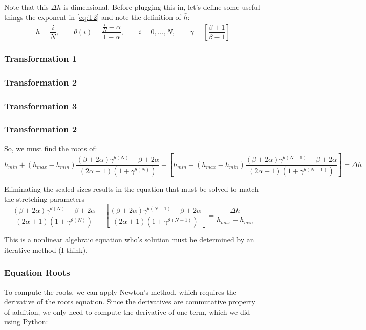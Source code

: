 \documentclass[11pt]{article}
\newcommand{\gammadef}{\left[\frac{\beta+1}{\beta-1}\right]}
\newcommand{\g}{\gamma}
\begin{document}
Note that this $\Delta h$ is dimensional. Before plugging this in, let's define some useful things the exponent in \ref{eq:T2} and note the definition of $\bar{h}$:
\begin{equation}
	\bar{h} = \frac{i}{N}, \qquad
	\theta(i) = \frac{\frac{i}{N} - \alpha}{1 - \alpha},
	\qquad i=0,...,N,
	\qquad \g = \gammadef
\end{equation}

\subsubsection{Transformation 1}

\subsubsection{Transformation 2}

\subsubsection{Transformation 3}

\subsubsection{Transformation 2}
So, we must find the roots of:
\begin{equation}
	h_{min} + (h_{max}-h_{min}) \frac{(\beta+2\alpha)\g^{\theta(N)} - \beta + 2\alpha}{(2\alpha+1)\left(1+\g^{\theta(N)} \right)}
	-
	\left[
	h_{min} + (h_{max}-h_{min}) \frac{(\beta+2\alpha)\g^{\theta(N-1)} - \beta + 2\alpha}{(2\alpha+1)\left(1+\g^{\theta(N-1)} \right)}
	\right]
	=
	\Delta h
\end{equation}

Eliminating the scaled sizes results in the equation that must be solved to match the stretching parameters
\begin{equation} \label{eq:T2_roots}
	\boxed{
	\frac{(\beta+2\alpha)\g^{\theta(N)} - \beta + 2\alpha}{(2\alpha+1) \left(1+\g^{\theta(N)} \right)}
	-
	\left[
	\frac{(\beta+2\alpha)\g^{\theta(N-1)} - \beta + 2\alpha}{(2\alpha+1) \left(1+\g^{\theta(N-1)} \right)}
	\right]
	=
	\frac{\Delta h}{h_{max}-h_{min}}
	}
\end{equation}

This is a nonlinear algebraic equation who's solution must be determined by an iterative method (I think).

\subsubsection{Equation Roots}
To compute the roots, we can apply Newton's method, which requires the derivative of the roots equation. Since the derivatives are commutative property of addition, we only need to compute the derivative of one term, which we did using Python:
\end{document}
